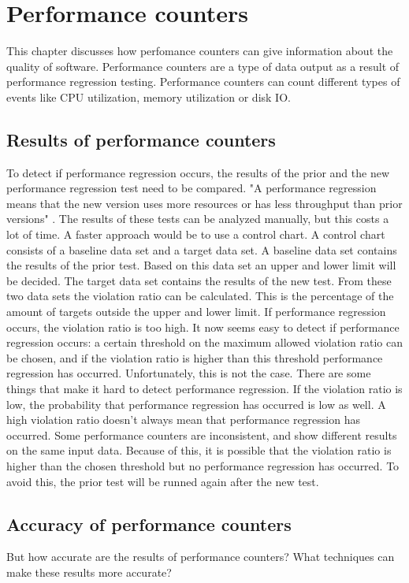 \section{Performance counters}

This chapter discusses how perfomance counters can give information about the quality of software. Performance counters are a type of data output as a result of performance regression testing. Performance counters can count different types of events like CPU utilization, memory utilization or disk IO.

\subsection{Results of performance counters}
To detect if performance regression occurs, the results of the prior and the new performance regression test need to be compared. "A performance regression means that the new version uses more resources or has less throughput than prior versions" \cite{Nguyenpage2chapter3}. The results of these tests can be analyzed manually, but this costs a lot of time. A faster approach would be to use a control chart. A control chart consists of a baseline data set and a target data set. A baseline data set contains the results of the prior test. Based on this data set an upper and lower limit will be decided. The target data set contains the results of the new test. From these two data sets the violation ratio can be calculated. This is the percentage of the amount of targets outside the upper and lower limit. If performance regression occurs, the violation ratio is too high. It now seems easy to detect if performance regression occurs: a certain threshold on the maximum allowed violation ratio can be chosen, and if the violation ratio is higher than this threshold performance regression has occurred. Unfortunately, this is not the case. There are some things that make it hard to detect performance regression. If the violation ratio is low, the probability that performance regression has occurred is low as well. A high violation ratio doesn't always mean that performance regression has occurred. Some performance counters are inconsistent, and show different results on the same input data. Because of this, it is possible that the violation ratio is higher than the chosen threshold but no performance regression has occurred. To avoid this, the prior test will be runned again after the new test.

\subsection{Accuracy of performance counters}
But how accurate are the results of performance counters? What techniques can make these results more accurate?

